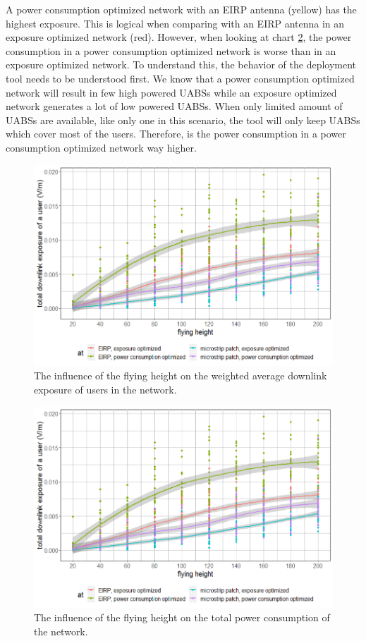 A power consumption optimized network with an \gls{EIRP} antenna (yellow) has the highest exposure. 
This is logical when comparing with an EIRP antenna in an exposure optimized network (red). 
However, when looking at chart \ref{fig:s2fhvspc}, the power consumption in a power consumption optimized network is worse 
than in an exposure optimized network. To understand this, the behavior of the deployment tool needs to be understood first. 
We know that a power consumption optimized network will result in few high powered \gls{UABS}s while an exposure optimized network 
generates a lot of low powered \gls{UABS}s. When only limited amount of \gls{UABS}s are available, 
like only one in this scenario, the tool will only keep \gls{UABS}s which cover most of the users. 
Therefore, is the power consumption in a power consumption optimized network way higher. 

\begin{figure}[h!]
  \includegraphics[width=\textwidth]{../results/s2/fhvsdl.png}
  \caption{The influence of the flying height on the weighted average downlink exposure of users in the network.}
  \label{fig:s2fhvsdl}
\end{figure}

\begin{figure}[h!]
  \includegraphics[width=\textwidth]{../results/s2/fhvsdl.png}
  \caption{The influence of the flying height on the total power consumption of the network.}
  \label{fig:s2fhvspc}
\end{figure}


